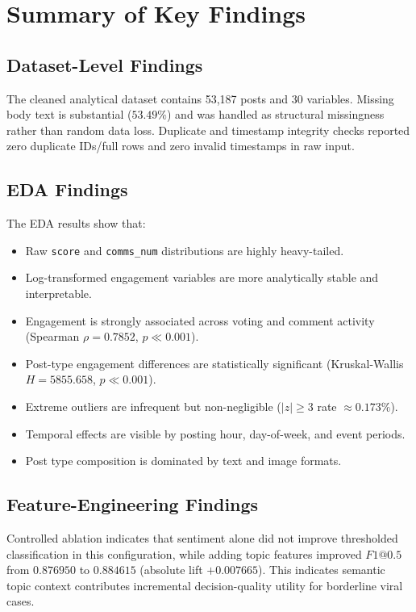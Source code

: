 \section{Summary of Key Findings}

\subsection{Dataset-Level Findings}
The cleaned analytical dataset contains 53,187 posts and 30 variables. Missing body text is substantial (\(53.49\%\)) and was handled as structural missingness rather than random data loss. Duplicate and timestamp integrity checks reported zero duplicate IDs/full rows and zero invalid timestamps in raw input.

\subsection{EDA Findings}
The EDA results show that:
\begin{itemize}
  \item Raw \texttt{score} and \texttt{comms\_num} distributions are highly heavy-tailed.
  \item Log-transformed engagement variables are more analytically stable and interpretable.
  \item Engagement is strongly associated across voting and comment activity (Spearman \(\rho = 0.7852\), \(p \ll 0.001\)).
  \item Post-type engagement differences are statistically significant (Kruskal-Wallis \(H = 5855.658\), \(p \ll 0.001\)).
  \item Extreme outliers are infrequent but non-negligible (\(|z| \ge 3\) rate \(\approx 0.173\%\)).
  \item Temporal effects are visible by posting hour, day-of-week, and event periods.
  \item Post type composition is dominated by text and image formats.
\end{itemize}

\subsection{Feature-Engineering Findings}
Controlled ablation indicates that sentiment alone did not improve thresholded classification in this configuration, while adding topic features improved \(F1@0.5\) from \(0.876950\) to \(0.884615\) (absolute lift \(+0.007665\)). This indicates semantic topic context contributes incremental decision-quality utility for borderline viral cases.

